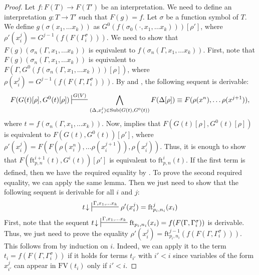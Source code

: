 \documentclass[reqno]{amsart}
\theoremstyle{definition}
\theoremstyle{remark}
\newcommand{\fs}[1]{\mathrm{#1}}
\newcommand{\FV}{\fs{FV}}
\newcommand{\ft}{\fs{ft}}
\newcommand{\sub}{\fs{Sub}}
\numberwithin{figure}{section}
\begin{document}
\begin{proof}
Let $f : F(T) \to F(T')$ be an interpretation.
We need to define an interpretation $g : T \to T'$ such that $F(g) = f$.
Let $\sigma$ be a function symbol of $T$.
We define $g(\sigma(x_1, \ldots x_k))$ as $G^0(f(\sigma_0(\cdot, x_1, \ldots x_k)))[\rho']$, where $\rho'(x_i^j) = G^{j-1}(f(F(\Gamma^\sigma_i)))$.
We need to show that $F(g)(\sigma_n(\Gamma, x_1, \ldots x_k))$ is equivalent to $f(\sigma_n(\Gamma, x_1, \ldots x_k))$.
First, note that $F(g)(\sigma_n(\Gamma, x_1, \ldots x_k))$ is equivalent to $F(\Gamma, G^0(f(\sigma_n(\Gamma, x_1, \ldots x_k)))[\rho])$, where $\rho(x_i^j) = G^{j-1}(f(F(\Gamma,\Gamma^\sigma_i)))$.
By  and , the following sequent is derivable:
\[ F(G(t)[\rho], G^0(t)[\rho]) \sststile{}{G(V)} \bigwedge_{(\Delta,x_i^j) \in \sub(G(t), G^0(t))} F(\Delta[\rho]) \equiv F(\rho(x^n), \ldots \rho(x^{j+1})), \]
where $t = f(\sigma_n(\Gamma, x_1, \ldots x_k))$.
Now,  implies that $F(G(t)[\rho], G^0(t)[\rho])$ is equivalent to $F(G(t), G^0(t))[\rho']$, where $\rho'(x_i^j) = F(F(\rho(x_i^n), \ldots \rho(x_i^{j+1})), \rho(x_i^j))$.
Thus, it is enough to show that $F(\ft^{i+1}_{p,n}(t), G^i(t))[\rho']$ is equivalent to $\ft^i_{p,n}(t)$.
If the first term is defined, then we have the required equality by .
To prove the second required equality, we can apply the same lemma.
Then we just need to show that the following sequent is derivable for all $i$ and $j$:
\[ t\!\downarrow\ \sststile{}{\Gamma, x_1, \ldots x_k} \rho'(x_i^j) = \ft^j_{p_i,n_i}(x_i) \]
First, note that the sequent $t\!\downarrow\ \sststile{}{\Gamma, x_1, \ldots x_k} \ft_{p_i,n_i}(x_i) = f(F(\Gamma, \Gamma^\sigma_i))$ is derivable.
Thus, we just need to prove the equality $\rho'(x_i^j) = \ft^{j-1}_{p_i,n_i}(f(F(\Gamma, \Gamma^\sigma_i)))$.
This follows from  by induction on $i$.
Indeed, we can apply it to the term $t_i = f(F(\Gamma, \Gamma^\sigma_i))$ if it holds for terms $t_{i'}$ with $i' < i$ since variables of the form $x_{i'}^j$ can appear in $\FV(t_i)$ only if $i' < i$.
\end{proof}



\end{document}

